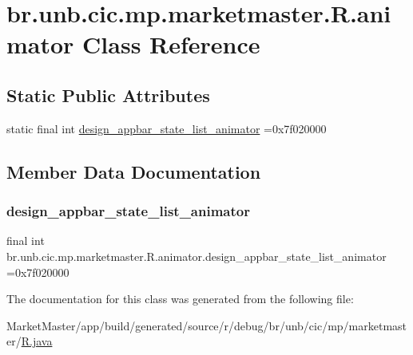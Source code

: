 \hypertarget{classbr_1_1unb_1_1cic_1_1mp_1_1marketmaster_1_1R_1_1animator}{}\section{br.\+unb.\+cic.\+mp.\+marketmaster.\+R.\+animator Class Reference}
\label{classbr_1_1unb_1_1cic_1_1mp_1_1marketmaster_1_1R_1_1animator}
\subsection*{Static Public Attributes}
\begin{DoxyCompactItemize}
\item 
static final int \mbox{\hyperlink{classbr_1_1unb_1_1cic_1_1mp_1_1marketmaster_1_1R_1_1animator_adbd64ef7a76fe9e1303f618a93eb021f}{design\+\_\+appbar\+\_\+state\+\_\+list\+\_\+animator}} =0x7f020000
\end{DoxyCompactItemize}


\subsection{Member Data Documentation}
\mbox{\label{classbr_1_1unb_1_1cic_1_1mp_1_1marketmaster_1_1R_1_1animator_adbd64ef7a76fe9e1303f618a93eb021f}} 
\subsubsection{\texorpdfstring{design\+\_\+appbar\+\_\+state\+\_\+list\+\_\+animator}{design\_appbar\_state\_list\_animator}}
{\footnotesize\ttfamily final int br.\+unb.\+cic.\+mp.\+marketmaster.\+R.\+animator.\+design\+\_\+appbar\+\_\+state\+\_\+list\+\_\+animator =0x7f020000\hspace{0.3cm}{\ttfamily [static]}}



The documentation for this class was generated from the following file\+:\begin{DoxyCompactItemize}
\item 
Market\+Master/app/build/generated/source/r/debug/br/unb/cic/mp/marketmaster/\mbox{\hyperlink{debug_2br_2unb_2cic_2mp_2marketmaster_2R_8java}{R.\+java}}\end{DoxyCompactItemize}

